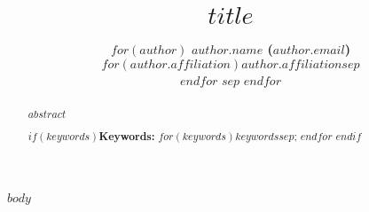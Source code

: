 \documentclass[10pt,letterpaper]{article}
\title{$title$}
\author{%
  $for(author)$
  {\large \bf $author.name$ ($author.email$)} \\
  $for(author.affiliation)$$author.affiliation$$sep$\\ $endfor$
  $sep$\AND
  $endfor$
}
\begin{document}
\maketitle


\begin{abstract}
  $abstract$
  
  $if(keywords)$\textbf{Keywords:} $for(keywords)$$keywords$$sep$; $endfor$ $endif$
\end{abstract}


$body$


% 


\printbibliography
\end{document}
